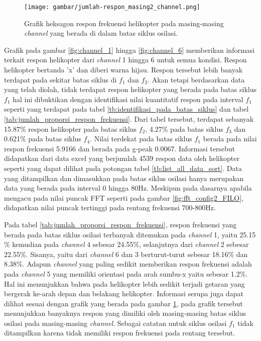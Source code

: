 \begin{figure}[H]
	\centering
	\texttt{[image: gambar/jumlah-respon\_masing2\_channel.png]}
	\caption{Grafik heksagon respon frekuensi helikopter pada masing-masing \textit{channel} yang berada di dalam batas siklus osilasi.}
	\label{fig:grafik_heksagon}
\end{figure}

Grafik pada gambar \ref{fig:channel_1} hingga \ref{fig:channel_6} memberikan informasi terkait respon helikopter dari \textit{channel} 1 hingga 6 untuk semua kondisi. Respon helikopter bertanda 'x' dan diberi warna hijau. Respon tersebut lebih banyak terdapat pada sekitar batas siklus di $f_1$ dan $f_2$. Akan tetapi berdasarkan data yang telah diolah, tidak terdapat respon helikopter yang berada pada batas siklus $f_1$ hal ini dibuktikan dengan identifikasi nilai kuantitatif respon pada interval $f_1$ seperti yang terdapat pada tabel \ref{tb:identifikasi_pada_batas_siklus} dan tabel \ref{tab:jumlah_proporsi_respon_frekuensi}. Dari tabel tersebut, terdapat sebanyak 15.87$\%$ respon helikopter pada batas siklus $f_2$, 4.27$\%$ pada batas siklus $f_3$ dan 0.621$\%$ pada batas siklus $f_4$. Nilai terdekat pada batas siklus $f_1$ berada pada nilai respon frekuensi 5.9166 dan berada pada g-peak 0.0067. Informasi tersebut didapatkan dari data excel yang berjumlah 4539 respon data oleh helikopter seperti yang dapat dilihat pada potongan tabel \ref{tb:list_all_data_sort}. Data yang ditampilkan dan dimasukkan pada batas siklus osilasi hanya merupakan data yang berada pada interval 0 hingga 80Hz. Meskipun pada dasarnya apabila mengacu pada nilai puncak FFT seperti pada gambar \ref{fig:fft_config2_FILO}, didapatkan nilai puncak tertinggi pada rentang frekuensi 700-800Hz.

Pada tabel \ref{tab:jumlah_proporsi_respon_frekuensi}, respon frekuensi yang berada pada batas siklus osilasi terbanyak ditemukan pada \textit{channel} 1, yaitu 25.15$\%$ kemudian pada \textit{channel} 4 sebesar 24.55$\%$, selanjutnya dari \textit{channel} 2 sebesar 22.55$\%$. Sisanya, yaitu dari \textit{channel} 6 dan 3 berturut-turut sebesar 18.16$\%$ dan 8.38$\%$. Adapun \textit{channel} yang paling sedikit memberikan respon frekuensi adalah pada \textit{channel} 5 yang memiliki orientasi pada arah sumbu-x yaitu sebesar 1.2$\%$. Hal ini menunjukkan bahwa pada helikopter lebih sedikit terjadi getaran yang bergerak ke-arah depan dan belakang helikopter. Informasi serupa juga dapat dilihat sesuai dengan grafik yang berada pada gambar \ref{fig:grafik_heksagon}, pada grafik tersebut menunjukkan banyaknya respon yang dimiliki oleh masing-masing batas siklus osilasi pada masing-masing \textit{channel}. Sebagai catatan untuk siklus osilasi $f_1$ tidak ditampilkan karena tidak memiliki respon frekuensi pada rentang tersebut. 

